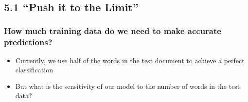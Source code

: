 \documentclass{article}
\begin{document}
    \begin{center}
    \end{center}
    { \hspace*{\fill} \\}
    
    \subsection{5.1 ``Push it to the Limit''}\label{push-it-to-the-limit}

\subsubsection{How much training data do we need to make accurate
predictions?}\label{how-much-training-data-do-we-need-to-make-accurate-predictions}

\begin{itemize}
\itemsep1pt\parskip0pt
\item
  Currently, we use half of the words in the test document to achieve a
  perfect classification
\item
  But what is the sensitivity of our model to the number of words in the
  test data?
\end{itemize}
\end{document}
